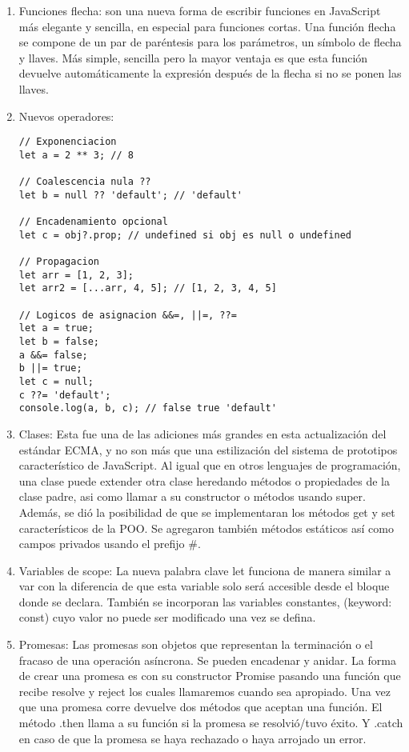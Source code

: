 \documentclass{article}
\begin{document}
\begin{enumerate}
      \item Funciones flecha: son una nueva forma
      de escribir funciones en JavaScript más elegante y sencilla, 
      en especial para funciones cortas. Una función flecha se compone de un 
      par de paréntesis para los parámetros, un símbolo de
      flecha y llaves. Más simple, sencilla pero la mayor ventaja es que 
      esta función devuelve automáticamente la
      expresión después de la flecha si no se ponen las llaves.

      \item Nuevos operadores:
\begin{lstlisting}
// Exponenciacion
let a = 2 ** 3; // 8

// Coalescencia nula ??
let b = null ?? 'default'; // 'default'

// Encadenamiento opcional
let c = obj?.prop; // undefined si obj es null o undefined

// Propagacion
let arr = [1, 2, 3];
let arr2 = [...arr, 4, 5]; // [1, 2, 3, 4, 5]

// Logicos de asignacion &&=, ||=, ??=
let a = true;
let b = false;
a &&= false;
b ||= true;
let c = null;
c ??= 'default';
console.log(a, b, c); // false true 'default'
\end{lstlisting}

      \item Clases: Esta fue una de las adiciones más grandes en esta 
      actualización del estándar ECMA, y no son más que una estilización 
      del sistema de prototipos característico de JavaScript. Al igual que 
      en otros lenguajes de programación, una clase puede extender otra 
      clase heredando métodos o propiedades de la clase padre, asi como 
      llamar a su constructor o métodos usando super. Además, se 
      dió la posibilidad de que se implementaran los métodos get y set 
      característicos de la POO. Se agregaron también métodos estáticos así
      como campos privados usando el prefijo \#.

      \item Variables de scope:  La nueva palabra clave let funciona de 
      manera similar a var con la diferencia de que esta variable solo será 
      accesible desde el bloque donde se declara. También se incorporan las 
      variables constantes, (keyword: const) cuyo valor no puede ser 
      modificado una vez se defina.

      \item Promesas: Las promesas son objetos que representan la terminación
      o el fracaso de una operación asíncrona. Se pueden encadenar y
      anidar. La forma de crear una promesa es con su constructor Promise 
      pasando una función que recibe resolve y reject los cuales llamaremos 
      cuando sea apropiado. Una vez que una promesa corre devuelve dos 
      métodos que aceptan una función. El método .then llama a su función si 
      la promesa se resolvió/tuvo éxito. Y .catch en caso de que la
      promesa se haya rechazado o haya arrojado un error.


\end{enumerate}
\end{document}
